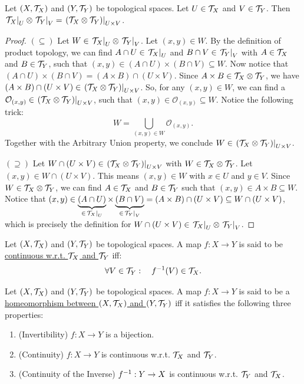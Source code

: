 \documentclass[11pt,reqno]{amsart}
\begin{document}
\begin{Thm}\label{comm}
Let $(X,\mathcal{T}_X)$ and $(Y,\mathcal{T}_Y)$ be topological spaces.
Let $U\in\mathcal{T}_X$ and $V\in\mathcal{T}_Y$.
Then
$
\eval{\T_X}_U\otimes\eval{\T_Y}_V
=
\eval{(\T_X\otimes\T_Y)}_{U\times V}
$.
\end{Thm}
\begin{proof}
$(\subseteq)$
Let $W\in\eval{\T_X}_U\otimes\eval{\T_Y}_V$.
Let $(x,y)\in W$. By the definition of product topology,
we can find $A\cap U\in\eval{\T_X}_U$ and
$B\cap V\in\eval{\T_Y}_V$ with $A\in\mathcal{T}_X$ and $B\in\mathcal{T}_Y$,
such that $(x,y)\in (A\cap U)\times(B\cap V)\subseteq W$.
Now notice that
$(A\cap U)\times(B\cap V)=(A\times B)\cap(U\times V)$.
Since $A\times B\in\mathcal{T}_X\otimes \mathcal{T}_Y$,
we have $(A\times B)\cap(U\times V)\in\eval{(\T_X\otimes\T_Y)}_{U\times V}$.
So, for any $(x,y)\in W$, we can find a
$\mathcal O_{(x,y)}\in\eval{(\T_X\otimes\T_Y)}_{U\times V}$,
such that $(x,y)\in\mathcal O_{(x,y)}\subseteq W$.
Notice the following trick:
\[W=\bigcup_{(x,y)\in W}\mathcal O_{(x,y)}.\]
Together with the Arbitrary Union property,
we conclude $W\in\eval{(\T_X\otimes\T_Y)}_{U\times V}$.

$(\supseteq)$
Let $W\cap(U\times V)\in\eval{(\T_X\otimes\T_Y)}_{U\times V}$
with $W\in\mathcal{T}_X\otimes \mathcal{T}_Y$. Let $(x,y)\in W\cap(U\times V)$.
This means $(x,y)\in W$ with $x\in U$ and $y\in V$.
Since $W\in\mathcal{T}_X\otimes\mathcal{T}_Y$, we can find $A\in\mathcal{T}_X$ and $B\in\mathcal{T}_Y$
such that $(x,y)\in A\times B\subseteq W$.
Notice that
$(x,y)\in\underbrace{(A\cap U)}_{\in\eval{\T_X}_U}
\times\underbrace{(B\cap V)}_{\in\eval{\T_Y}_V}=(A\times B)\cap (U\times V)
\subseteq W\cap(U\times V)$,
which is precisely the definition for
$W\cap(U\times V)\in\eval{\T_X}_U\otimes\eval{\T_Y}_V$.
\end{proof}

\begin{Def}
Let $(X,\mathcal{T}_X)$ and $(Y,\mathcal{T}_Y)$ be topological spaces.
A map $f:X\to Y$ is said to be \ul{continuous w.r.t. $\mathcal{T}_X$ and $\mathcal{T}_Y$} iff:
\[\forall V\in\T_Y:\quad f\inv\Br{V}\in\T_X.\]
\end{Def}

\begin{Def}
Let $(X,\mathcal{T}_X)$ and $(Y,\mathcal{T}_Y)$ be topological spaces.
A map $f:X\to Y$ is said to be a
\ul{homeomorphism between $(X,\mathcal{T}_X)$ and $(Y,\mathcal{T}_Y)$} iff it satisfies
the following three properties:
\begin{enumerate}
\item (Invertibility) $f:X\to Y$ is a bijection.
\item (Continuity) $f:X\to Y$ is continuous w.r.t. $\mathcal{T}_X$ and $\mathcal{T}_Y$.
\item (Continuity of the Inverse) $f^{-1}:Y\to X$ is continuous w.r.t. $\mathcal{T}_Y$ and $\mathcal{T}_X$.
\end{enumerate}
\end{Def}
\end{document}
